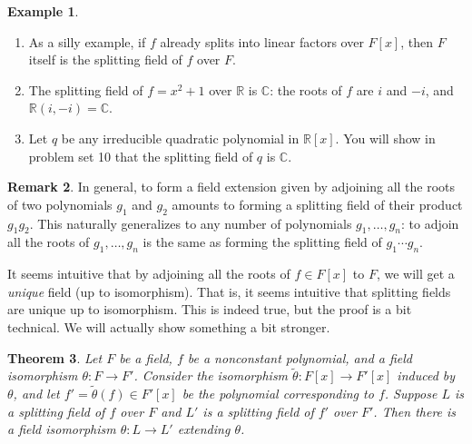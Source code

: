 \documentclass[12pt]{report}
\newtheorem{theorem}{Theorem}[chapter]
\numberwithin{equation}{section}
\numberwithin{theorem}{chapter}
\theoremstyle{definition}
\newtheorem{example}[theorem]{Example}
\newtheorem*{basic properties}{Basic Properties}
\newtheorem*{Important Remark}{Important Remark}
\newtheorem{remark}[theorem]{Remark}
\newcommand{\C}{\mathbb{C}}
\begin{document}
\begin{example}$\,$
\begin{enumerate}[label=\alph*),leftmargin=15pt]
\item As a silly example, if $f$ already splits into linear factors over $F[x]$, then $F$ itself is the splitting field of $f$ over $F$.
\item The splitting field of $f = x^2 + 1$ over $\mathbb{R}$ is $\C$: the roots of $f$ are $i$ and $-i$, and $\mathbb{R}(i,-i) = \C$.
\item Let $q$ be any irreducible quadratic polynomial in $\mathbb{R}[x]$. You will show in problem set 10 that the splitting field of $q$ is $\C$.
\end{enumerate}
\end{example}


\begin{remark}
In general, to form a field extension given by adjoining all the roots of two polynomials $g_1$ and $g_2$ amounts to forming a splitting field of their product $g_1 g_2$. This naturally generalizes to any number of polynomials $g_1, \ldots, g_n$: to adjoin all the roots of $g_1, \ldots, g_n$ is the same as forming the splitting field of $g_1 \cdots g_n$.
\end{remark}



It seems intuitive that by adjoining all the roots of $f \in F[x]$ to $F$, we will get a {\em unique} field (up to isomorphism). That is, it seems intuitive that splitting fields are unique up to isomorphism. This is indeed true, but the proof is a bit technical. We will actually show something a bit stronger.



\begin{theorem}\label{general fact to show uniqueness of splitting fields}
Let $F$ be a field, $f$ be a nonconstant polynomial, and a field isomorphism $\theta\!: F \to F'$. Consider the isomorphism $\tilde\theta\!:F[x] \to F'[x]$ induced by $\theta$, and let $f'=\tilde\theta(f) \in F'[x]$ be the polynomial corresponding to $f$. 
Suppose $L$ is a splitting field of $f$ over $F$ and $L'$ is a splitting field of $f'$ over $F'$. Then there is a field isomorphism $\widehat{\theta}: L \to L'$ extending $\theta$.
\end{theorem}
\end{document}
